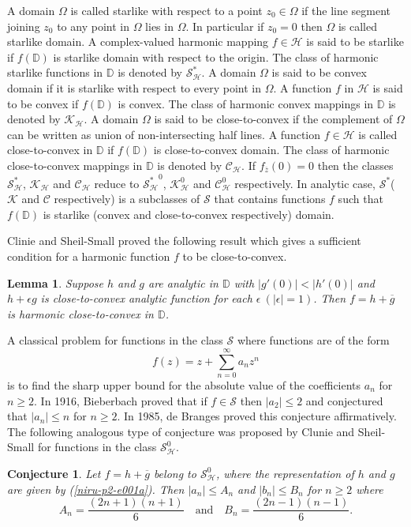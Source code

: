 \documentclass[a4paper,12pt]{amsart}
\theoremstyle{plain}
\newtheorem{lem}[equation]{Lemma}
\newtheorem{conj}{Conjecture}
\theoremstyle{definition}
\begin{document}
A domain $\Omega$ is called starlike with respect to a point $z_0\in \Omega$ if the line segment joining $z_0$ to any point in
$\Omega$ lies in $\Omega$. In particular if $z_0=0$ then $\Omega$ is called starlike domain.
A complex-valued harmonic mapping $f\in\mathcal{H}$ is said to be starlike if $f(\mathbb{D})$ is starlike domain with respect to the origin. The class of harmonic starlike functions in $\mathbb{D}$ is denoted by $\mathcal{S^*_H}$. A domain $\Omega$ is said to be convex domain if it is starlike with respect to
every point in $\Omega$. A function  $f$ in  $\mathcal{H}$ is said to be convex if $f(\mathbb{D})$ is convex. The class of harmonic convex  mappings in $\mathbb{D}$ is denoted by $\mathcal{K_H}$. A domain $\Omega$ is said to be close-to-convex if the complement of $\Omega$ can be written as  union of non-intersecting half lines. A function $f\in \mathcal{H}$ is called close-to-convex in $\mathbb{D}$ if  $f(\mathbb{D})$ is close-to-convex domain. The class of  harmonic close-to-convex mappings in $\mathbb{D}$ is denoted by $\mathcal{C_H}$.
If $f_{\overline{z}}(0) = 0$ then the classes $\mathcal{S^*_H}$, $\mathcal{K_H}$ and $\mathcal{C_H}$ reduce to
$\mathcal{S^*_H}^0$, $\mathcal{K}^0_{\mathcal{H}}$ and $\mathcal{C}^0_{\mathcal{H}}$ respectively.
In analytic case, $\mathcal{S}^*$($\mathcal{K}$ and $\mathcal{C}$ respectively) is a subclasses of $\mathcal{S}$ that contains functions $f$  such that  $f(\mathbb{D})$ is starlike (convex and close-to-convex respectively) domain. 

Clinie and Sheil-Small \cite{Clunie-1984} proved the following result which gives a sufficient condition for a harmonic function $f$ to be close-to-convex.

\begin{lem}{\cite{Clunie-1984}}\label{niru-p2-l001}
Suppose $h$ and $g$ are analytic in $\mathbb{D}$ with $|g'(0)|< |h'(0)|$ and $h + \epsilon g$ is close-to-convex analytic function for each $\epsilon~ (|\epsilon| = 1)$. Then $f = h + \overline{g}$ is harmonic close-to-convex in $\mathbb{D}$.
\end{lem}

A classical problem for functions in the class $\mathcal{S}$ where functions are of the form
 $$
 f(z)  = z + \sum_{n =0}^{\infty}a_n z^n
 $$
  is to find the sharp upper bound for the absolute value of the coefficients $a_n$ for $n\geq 2$. In 1916, Bieberbach \cite{Bieberbach-1916} proved that if $f\in\mathcal{S}$ then $|a_2|\leq2$ and conjectured that $|a_n|\leq n$ for  $n\ge 2$. In 1985, de Branges \cite{Branges-1985} proved this conjecture affirmatively. The following analogous type of conjecture was proposed by Clunie and Sheil-Small \cite{Clunie-1984}  for  functions in  the class $\mathcal{S}^0_{\mathcal{H}}$.
\begin{conj}\label{niru-p2-c001}
Let $f = h + \overline{g}$ belong to $\mathcal{S}^0_{\mathcal{H}}$, where the representation of $h$ and $g$ are given by (\ref{niru-p2-e001a}). Then $|a_n|\leq A_n$ and $|b_n|\leq B_n$ for  $n\geq 2$ where
\begin{equation}\label{niru-p2-e005}
A_n = \frac{(2n + 1)(n + 1)}{6} \quad \mbox{and} \quad B_n = \frac{(2n - 1)(n - 1)}{6}.
\end{equation}
\end{conj}
\end{document}
